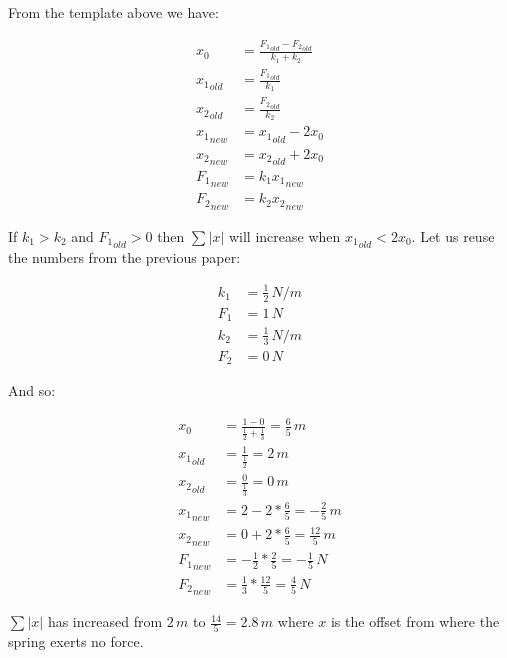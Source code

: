 \documentclass[]{elementary-physics}
\begin{document}
From the template above we have:

\begin{subequations}
\begin{align}
x_0 &= \frac{{F_1}_{old}-{F_2}_{old}}{k_1 + k_2} \\
{x_1}_{old} &= \frac{{F_1}_{old}}{k_1} \\
{x_2}_{old} &= \frac{{F_2}_{old}}{k_2} \\
{x_1}_{new} &= {x_1}_{old} -2 x_0 \\
{x_2}_{new} &= {x_2}_{old} +2 x_0 \\
{F_1}_{new} &= k_1 {x_1}_{new} \\
{F_2}_{new} &= k_2 {x_2}_{new}
\end{align}
\end{subequations}

If $k_1 > k_2$ and ${F_1}_{old} > 0$ then $\sum |x|$ will increase when ${x_1}_{old} < 2 x_0$.
Let us reuse the numbers from the previous paper\cite{ef2ch}:

\begin{subequations}
\begin{align}
k_1 &= \frac{1}{2} \, N/m \\
F_1 &= 1 \, N \\
k_2 &= \frac{1}{3} \, N/m \\
F_2 &= 0 \, N
\end{align}
\end{subequations}

And so:

\begin{subequations}
\begin{align}
x_0 &= \frac{1-0}{\frac{1}{2} + \frac{1}{3}} = \frac{6}{5} \, m \\
{x_1}_{old} &= \frac{1}{\frac{1}{2}} = 2 \, m \\
{x_2}_{old} &= \frac{0}{\frac{1}{3}} = 0 \, m \\
{x_1}_{new} &= 2 -2 * \frac{6}{5} = -\frac{2}{5} \, m \\
{x_2}_{new} &= 0 +2 * \frac{6}{5} = \frac{12}{5} \, m \\
{F_1}_{new} &= - \frac{1}{2} * \frac{2}{5} = -\frac{1}{5} \, N \\
{F_2}_{new} &= \frac{1}{3} * \frac{12}{5} = \frac{4}{5} \, N
\end{align}
\end{subequations}

$\sum |x|$ has increased from $2 \, m$ to $\frac{14}{5} = 2.8 \, m$ where $x$ is the offset from where the spring exerts no force.
\end{document}
